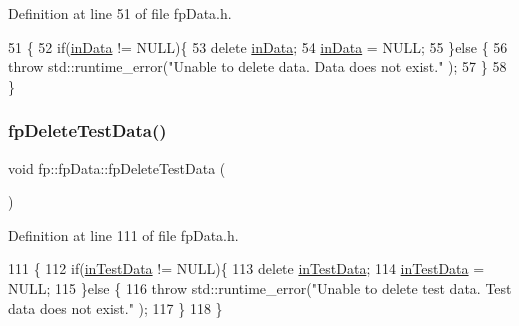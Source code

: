 Definition at line 51 of file fp\+Data.\+h.


\begin{DoxyCode}
51                                \{
52                 \textcolor{keywordflow}{if}(\hyperlink{classfp_1_1fpData_a49d7c3f58bcf88843c25b1b0c9714ebe}{inData} != NULL)\{
53                     \textcolor{keyword}{delete} \hyperlink{classfp_1_1fpData_a49d7c3f58bcf88843c25b1b0c9714ebe}{inData};
54                     \hyperlink{classfp_1_1fpData_a49d7c3f58bcf88843c25b1b0c9714ebe}{inData} = NULL;
55                 \}\textcolor{keywordflow}{else} \{
56                     \textcolor{keywordflow}{throw} std::runtime\_error(\textcolor{stringliteral}{"Unable to delete data.  Data does not exist."} );
57                 \}
58             \}
\end{DoxyCode}
\mbox{\label{classfp_1_1fpData_a996eedfc5ffe559ce1f6061af1efc1db}} 
\subsubsection{\texorpdfstring{fp\+Delete\+Test\+Data()}{fpDeleteTestData()}}
{\footnotesize\ttfamily void fp\+::fp\+Data\+::fp\+Delete\+Test\+Data (\begin{DoxyParamCaption}{ }\end{DoxyParamCaption})\hspace{0.3cm}{\ttfamily [inline]}}



Definition at line 111 of file fp\+Data.\+h.


\begin{DoxyCode}
111                        \{
112                 \textcolor{keywordflow}{if}(\hyperlink{classfp_1_1fpData_ad4f4dd3a8d15633b7f983932fa60bbad}{inTestData} != NULL)\{
113                     \textcolor{keyword}{delete} \hyperlink{classfp_1_1fpData_ad4f4dd3a8d15633b7f983932fa60bbad}{inTestData};
114                     \hyperlink{classfp_1_1fpData_ad4f4dd3a8d15633b7f983932fa60bbad}{inTestData} = NULL;
115                 \}\textcolor{keywordflow}{else} \{
116                     \textcolor{keywordflow}{throw} std::runtime\_error(\textcolor{stringliteral}{"Unable to delete test data.  Test data does not exist."} );
117                 \}
118             \}
\end{DoxyCode}
\mbox{\label{classfp_1_1fpData_a91c727b1475eca340ca14c241b25c959}} 
